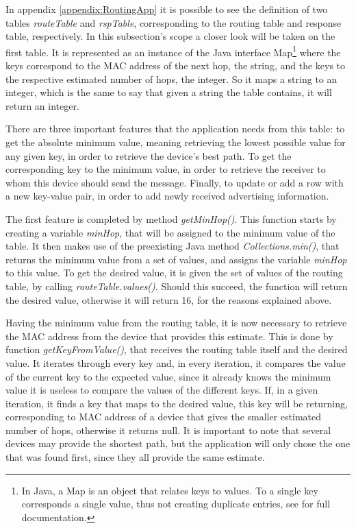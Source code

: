 In appendix \ref{appendix:RoutingApp} it is possible to see the definition of two tables \textit{routeTable} and \textit{rspTable}, corresponding to the routing table and response table, respectively. In this subsection's scope a closer look will be taken on the first table. It is represented as an instance of the Java interface Map\footnote{In Java, a Map is an object that relates keys to values. To a single key corresponds a single value, thus not creating duplicate entries, see \cite{map} for full documentation.} where the keys correspond to the \gls{MAC} address of the next hop, the string, and the keys to the respective estimated number of hops, the integer. So it maps a string to an integer, which is the same to say that given a string the table contains, it will return an integer.

There are three important features that the application needs from this table: to get the absolute minimum value, meaning retrieving the lowest possible value for any given key, in order to retrieve the device's best path. To get the corresponding key to the minimum value, in order to retrieve the receiver to whom this device should send the message. Finally, to update or add a row with a new key-value pair, in order to add newly received advertising information.

The first feature is completed by method \textit{getMinHop()}. This function starts by creating a variable \textit{minHop}, that will be assigned to the minimum value of the table. It then makes use of the preexisting Java method \textit{Collections.min()}, that returns the minimum value from a set of values, and assigns the variable \textit{minHop} to this value. To get the desired value, it is given the set of values of the routing table, by calling \textit{routeTable.values()}. Should this succeed, the function will return the desired value, otherwise it will return 16, for the reasons explained above.

Having the minimum value from the routing table, it is now necessary to retrieve the \gls{MAC} address from the device that provides this estimate. This is done by function \textit{getKeyFromValue()}, that receives the routing table itself and the desired value. It iterates through every key and, in every iteration, it compares the value of the current key to the expected value, since it already knows the minimum value it is useless to compare the values of the different keys. If, in a given iteration, it finds a key that maps to the desired value, this key will be returning, corresponding to \gls{MAC} address of a device that gives the smaller estimated number of hops, otherwise it returns null. It is important to note that several devices may provide the shortest path, but the application will only chose the one that was found first, since they all provide the same estimate.

